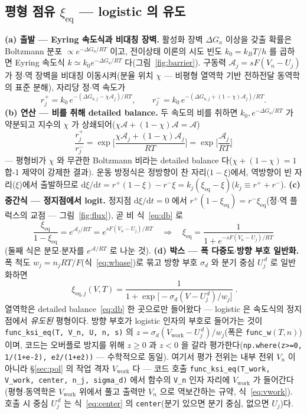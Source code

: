 \documentclass[11pt,a4paper]{article}
\newcommand{\dd}{\mathrm{d}}
\newcommand{\eq}{\mathrm{eq}}
\newcommand{\work}{\mathrm{work}}
\newcommand{\code}[1]{\texttt{#1}}
\begin{document}
\subsection{평형 점유 $\xi_\eq$ — logistic 의 유도}
\textbf{(a) 출발 — Eyring 속도식과 비대칭 장벽.} 활성화 장벽 $\Delta G_a$ 이상을 갖출 확률은 Boltzmann 분포
$\propto e^{-\Delta G_a/RT}$ 이고, 전이상태 이론의 시도 빈도 $k_0=k_BT/h$ 를 곱하면 Eyring 속도식
$k\simeq k_0e^{-\Delta G_a/RT}$ 다(그림~\ref{fig:barrier})\cite{eyring1935}. 구동력 $\mathcal A_j=sF(V_n-U_j)$ 가 정$\cdot$역 장벽을
비대칭 이동시켜(분율 위치 $\chi$ — 비평형 열역학 기반 전하전달 동역학의 표준 분해\cite{bazant2013}), 자리당 정$\cdot$역 속도가
\begin{equation}
r_j^+=k_0\,e^{-(\Delta G_{a,j}-\chi\mathcal A_j)/RT},\qquad
r_j^-=k_0\,e^{-(\Delta G_{a,j}+(1-\chi)\mathcal A_j)/RT}.
\label{eq:bv}
\end{equation}
\textbf{(b) 연산 — 비를 취해 detailed balance.} 두 속도의 비를 취하면 $k_0,e^{-\Delta G_a/RT}$ 가 약분되고 지수의
$\chi$ 가 상쇄되어($\chi\mathcal A+(1-\chi)\mathcal A=\mathcal A$)
\begin{equation}
\frac{r_j^+}{r_j^-}=\exp\!\Big[\frac{\chi\mathcal A_j+(1-\chi)\mathcal A_j}{RT}\Big]=\exp\!\Big[\frac{\mathcal A_j}{RT}\Big]
\label{eq:db}
\end{equation}
— 평형비가 $\chi$ 와 무관한 Boltzmann 비라는 detailed balance 다($\chi+(1-\chi)=1$ 합-1 제약이 강제한 결과). 운동
방정식은 정방향이 찬 자리($1-\xi$)에서, 역방향이 빈 자리($\xi$)에서 출발하므로
$\dd\xi/\dd t=r^+(1-\xi)-r^-\xi=k_j(\xi_\eq-\xi)$($k_j\equiv r^++r^-$). \textbf{(c) 중간식 — 정지점에서 logit.}
정지점 $\dd\xi/\dd t=0$ 에서 $r^+(1-\xi_\eq)=r^-\xi_\eq$(정$\cdot$역 플럭스의 교점 — 그림~\ref{fig:flux}), 곧
비 식~\eqref{eq:db} 로
\begin{equation}
\frac{\xi_\eq}{1-\xi_\eq}=e^{\mathcal A_j/RT}=e^{sF(V_n-U_j)/RT}
\quad\Longrightarrow\quad
\xi_\eq=\frac{1}{1+e^{-sF(V_n-U_j)/RT}}
\label{eq:logisticsolve}
\end{equation}
(둘째 식은 분모$\cdot$분자를 $e^{\mathcal A/RT}$ 로 나눈 것). \textbf{(d) 박스 — 폭 다중도$\cdot$방향 부호 일반화.}
폭 척도 $w_j=n_jRT/F$(식~\eqref{eq:wbase})로 묶고 방향 부호 $\sigma_d$ 와 분기 중심 $U_j^{\,d}$ 로 일반화하면
\begin{equation}
\boxed{\;\xi_{\eq,j}(V,T)=\frac{1}{1+\exp\!\big[-\sigma_d(V-U_j^{\,d})/w_j\big]}\;.}
\label{eq:xieq}
\end{equation}
열역학은 detailed balance~\eqref{eq:db} 한 곳으로만 들어왔다 — logistic 은 속도식의 정지점에서 \emph{유도된}
평형이다. 방향 부호가 logistic 인자의 부호로 들어가는 것이 \code{func\_ksi\_eq(T, V\_n, U, n, s)} 의
$z=\sigma_d(V_\work-U_j^{\,d})/w_j$(폭은 \code{func\_w}$(T,n)$)이며, 코드는 오버플로 방지를 위해 $z\ge0$ 과 $z<0$ 을
갈라 평가한다(\code{np.where(z>=0, 1/(1+e\^{-z}), e\^{z}/(1+e\^{z}))} — 수학적으로 동일). 여기서 평가 전위는
내부 전위 $V_n$ 이 아니라 \S\ref{sec:pol} 의 작업 격자 $V_\work$ 다 — 코드 호출 \code{func\_ksi\_eq(T\_work,
V\_work, center, n\_j, sigma\_d)} 에서 함수의 \code{V\_n} 인자 자리에 $V_\work$ 가 들어간다(평형$\cdot$동역학은
$V_\work$ 위에서 풀고 출력만 $V_n$ 으로 역보간하는 규약, 식~\eqref{eq:vwork}). 호출 시 중심 $U_j^{\,d}$ 는
식~\eqref{eq:center} 의 \code{center}(분기 있으면 분기 중심, 없으면 $U_j$)다.
\end{document}
